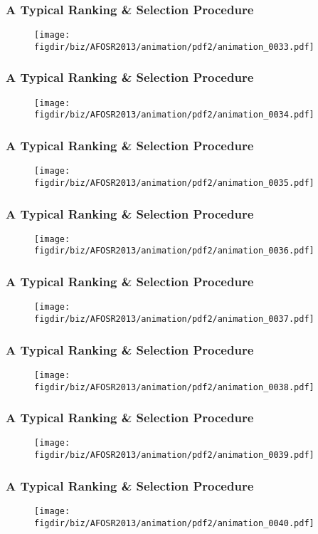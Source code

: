 \documentclass[13pt]{beamer}
\newcommand{\figdir}{../../fig}
\begin{document}
\begin{frame}\frametitle{A Typical Ranking \& Selection Procedure}\begin{figure}\texttt{[image: \\figdir/biz/AFOSR2013/animation/pdf2/animation\_0033.pdf]}\end{figure}\end{frame}
\begin{frame}\frametitle{A Typical Ranking \& Selection Procedure}\begin{figure}\texttt{[image: \\figdir/biz/AFOSR2013/animation/pdf2/animation\_0034.pdf]}\end{figure}\end{frame}
\begin{frame}\frametitle{A Typical Ranking \& Selection Procedure}\begin{figure}\texttt{[image: \\figdir/biz/AFOSR2013/animation/pdf2/animation\_0035.pdf]}\end{figure}\end{frame}
\begin{frame}\frametitle{A Typical Ranking \& Selection Procedure}\begin{figure}\texttt{[image: \\figdir/biz/AFOSR2013/animation/pdf2/animation\_0036.pdf]}\end{figure}\end{frame}
\begin{frame}\frametitle{A Typical Ranking \& Selection Procedure}\begin{figure}\texttt{[image: \\figdir/biz/AFOSR2013/animation/pdf2/animation\_0037.pdf]}\end{figure}\end{frame}
\begin{frame}\frametitle{A Typical Ranking \& Selection Procedure}\begin{figure}\texttt{[image: \\figdir/biz/AFOSR2013/animation/pdf2/animation\_0038.pdf]}\end{figure}\end{frame}
\begin{frame}\frametitle{A Typical Ranking \& Selection Procedure}\begin{figure}\texttt{[image: \\figdir/biz/AFOSR2013/animation/pdf2/animation\_0039.pdf]}\end{figure}\end{frame}
\begin{frame}\frametitle{A Typical Ranking \& Selection Procedure}\begin{figure}\texttt{[image: \\figdir/biz/AFOSR2013/animation/pdf2/animation\_0040.pdf]}\end{figure}\end{frame}
\end{document}
